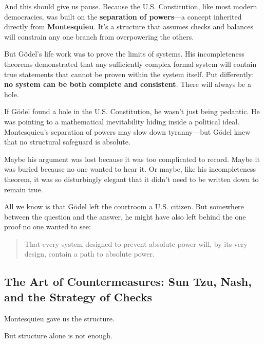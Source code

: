 \begin{tcolorbox}[title=Historical Sidebar: Gödel’s Missing Proof — The Constitutional Loophole That Was Never Written Down, colback=gray!5!white, colframe=black!80!white, breakable, fonttitle=\bfseries]
  \medskip
  
  And this should give us pause. Because the U.S. Constitution, like most modern democracies, was built on the \textbf{separation of powers}—a concept inherited directly from \textbf{Montesquieu}. It’s a structure that assumes checks and balances will constrain any one branch from overpowering the others.  

  \medskip
  
  But Gödel’s life work was to prove the limits of systems. His incompleteness theorems demonstrated that any sufficiently complex formal system will contain true statements that cannot be proven within the system itself. Put differently: \textbf{no system can be both complete and consistent}. There will always be a hole.  

  \medskip
  
  If Gödel found a hole in the U.S. Constitution, he wasn’t just being pedantic. He was pointing to a mathematical inevitability hiding inside a political ideal. Montesquieu’s separation of powers may slow down tyranny—but Gödel knew that no structural safeguard is absolute.  

  \medskip
  
  Maybe his argument was lost because it was too complicated to record. Maybe it was buried because no one wanted to hear it. Or maybe, like his incompleteness theorem, it was so disturbingly elegant that it didn’t need to be written down to remain true.  

  \medskip
  
  All we know is that Gödel left the courtroom a U.S. citizen. But somewhere between the question and the answer, he might have also left behind the one proof no one wanted to see:  

  \begin{quote}
  That every system designed to prevent absolute power will, by its very design, contain a path to absolute power.
  \end{quote}
  
\end{tcolorbox}


\subsection{The Art of Countermeasures: Sun Tzu, Nash, and the Strategy of Checks}

Montesquieu gave us the structure.

But structure alone is not enough.

